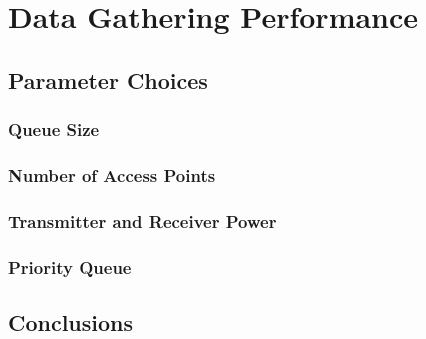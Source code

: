 \chapter{Data Gathering Performance}\label{data_gathering_performance} 

    
	

    \section{Parameter Choices}\label{data_gathering_performance_parameter_choices}


        \subsection{Queue Size}\label{data_gathering_performance_parameter_choices_queue_size}


        \subsection{Number of Access Points}\label{data_gathering_performance_parameter_choices_number_of_access_points}


        \subsection{Transmitter and Receiver Power}\label{data_gathering_performance_parameter_choices_transmitter_and_reciever_power}


        \subsection{Priority Queue}\label{data_gathering_performance_parameter_choices_priority_queue}



    \section{Conclusions}\label{data_gathering_performance_conclusions}

